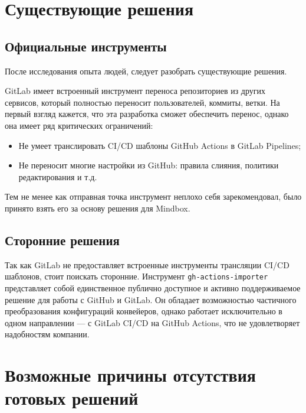 \section{Существующие решения}\label{sec:existing-solutions}
\subsection{Официальные инструменты} \label{subsec:official-migration-instruments}
После исследования опыта людей, следует разобрать существующие решения.

GitLab имеет встроенный инструмент переноса репозиториев из других сервисов\cite{official-gl-migrator}, который полностью переносит пользователей, коммиты, ветки.
На первый взгляд кажется, что эта разработка сможет обеспечить перенос, однако она имеет ряд критических ограничений:
\begin{itemize}
  \item Не умеет транслировать CI/CD шаблоны GitHub Actions в GitLab Pipelines;
  \item Не переносит многие настройки из GitHub: правила слияния, политики редактирования и т.д.
\end{itemize}
Тем не менее как отправная точка инструмент неплохо себя зарекомендовал, было принято взять его за основу решения для Mindbox.

\subsection{Сторонние решения} \label{subsec:third-party-migration-instruments}
Так как GitLab не предоставляет встроенные инструменты трансляции CI/CD шаблонов, стоит поискать сторонние.
Инструмент \texttt{gh-actions-importer}\cite{gh-actions-importer} представляет собой единственное публично доступное и активно поддерживаемое решение для работы с GitHub и GitLab.
Он обладает возможностью частичного преобразования конфигураций конвейеров, однако работает исключительно в одном направлении — с GitLab CI/CD на GitHub Actions,
что не удовлетворяет надобностям компании.

\section{Возможные причины отсутствия готовых решений} \label{sec:instrument-absence}

